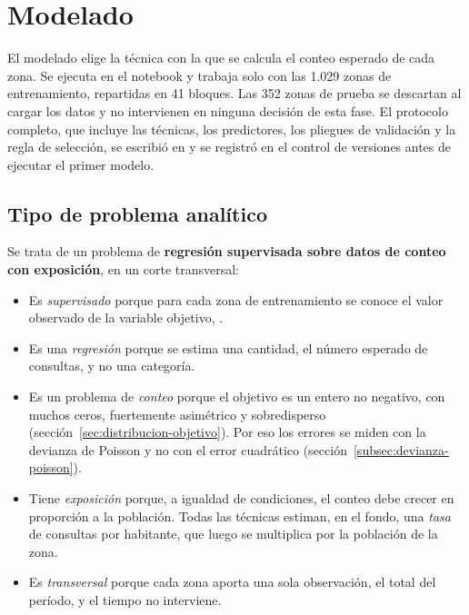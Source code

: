 \section{Modelado}
\label{sec:modelado}

El modelado elige la técnica con la que se calcula el conteo esperado de cada zona. Se
ejecuta en el notebook  y trabaja solo con las 1.029 zonas de
entrenamiento, repartidas en 41 bloques. Las 352 zonas de prueba se descartan al cargar
los datos y no intervienen en ninguna decisión de esta fase. El protocolo completo, que
incluye las técnicas, los predictores, los pliegues de validación y la regla de selección,
se escribió en  y se registró en el control de versiones antes de ejecutar
el primer modelo.

\subsection{Tipo de problema analítico}
\label{sec:tipo-problema}

Se trata de un problema de \textbf{regresión supervisada sobre datos de conteo con
exposición}, en un corte transversal:
\begin{itemize}
  \item Es \emph{supervisado} porque para cada zona de entrenamiento se conoce el valor
        observado de la variable objetivo, .
  \item Es una \emph{regresión} porque se estima una cantidad, el número esperado de
        consultas, y no una categoría.
  \item Es un problema de \emph{conteo} porque el objetivo es un entero no negativo, con
        muchos ceros, fuertemente asimétrico y sobredisperso
        (sección~\ref{sec:distribucion-objetivo}). Por eso los errores se miden con la
        devianza de Poisson y no con el error cuadrático (sección~\ref{subsec:devianza-poisson}).
  \item Tiene \emph{exposición} porque, a igualdad de condiciones, el conteo debe crecer en
        proporción a la población. Todas las técnicas estiman, en el fondo, una
        \emph{tasa} de consultas por habitante, que luego se multiplica por la población de
        la zona.
  \item Es \emph{transversal} porque cada zona aporta una sola observación, el total del
        período, y el tiempo no interviene.
\end{itemize}

